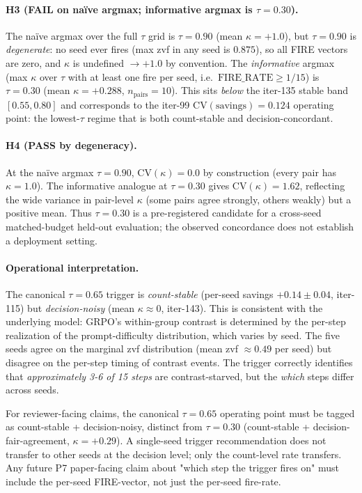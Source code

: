 \paragraph{H3 (FAIL on naïve argmax; informative argmax is $\tau=0.30$).}
The naïve argmax over the full $\tau$ grid is $\tau=0.90$ (mean
$\kappa=+1.0$), but $\tau=0.90$ is \emph{degenerate}: no seed ever
fires (max zvf in any seed is $0.875$), so all FIRE vectors are
zero, and $\kappa$ is undefined $\to +1.0$ by convention. The
\emph{informative} argmax (max $\kappa$ over $\tau$ with at least one
fire per seed, i.e.\ $\mathrm{FIRE\_RATE} \geq 1/15$) is
$\tau=0.30$ (mean $\kappa=+0.288$, $n_\mathrm{pairs}=10$). This
sits \emph{below} the iter-135 stable band $[0.55, 0.80]$ and
corresponds to the iter-99 $\mathrm{CV}(\mathrm{savings})=0.124$
operating point: the lowest-$\tau$ regime that is both count-stable
and decision-concordant.

\paragraph{H4 (PASS by degeneracy).}
At the naïve argmax $\tau=0.90$, $\mathrm{CV}(\kappa)=0.0$ by
construction (every pair has $\kappa=1.0$). The informative analogue
at $\tau=0.30$ gives $\mathrm{CV}(\kappa)=1.62$, reflecting the
wide variance in pair-level $\kappa$ (some pairs agree strongly,
others weakly) but a positive mean.  Thus $\tau=0.30$ is a
pre-registered candidate for a cross-seed matched-budget held-out evaluation;
the observed concordance does not establish a deployment setting.

\paragraph{Operational interpretation.}
The canonical $\tau=0.65$ trigger is \emph{count-stable} (per-seed
savings $+0.14 \pm 0.04$, iter-115) but \emph{decision-noisy}
(mean $\kappa \approx 0$, iter-143). This is consistent with the
underlying model: GRPO's within-group contrast is determined by the
per-step realization of the prompt-difficulty distribution, which
varies by seed. The five seeds agree on the marginal zvf distribution
(mean zvf $\approx 0.49$ per seed) but disagree on the per-step
timing of contrast events. The trigger correctly identifies that
\emph{approximately 3-6 of 15 steps} are contrast-starved, but the
\emph{which} steps differ across seeds.

For reviewer-facing claims, the canonical $\tau=0.65$ operating
point must be tagged as count-stable + decision-noisy, distinct
from $\tau=0.30$ (count-stable + decision-fair-agreement,
$\kappa=+0.29$). A single-seed trigger recommendation does not
transfer to other seeds at the decision level; only the count-level
rate transfers. Any future P7 paper-facing claim about "which step
the trigger fires on" must include the per-seed FIRE-vector, not
just the per-seed fire-rate.
